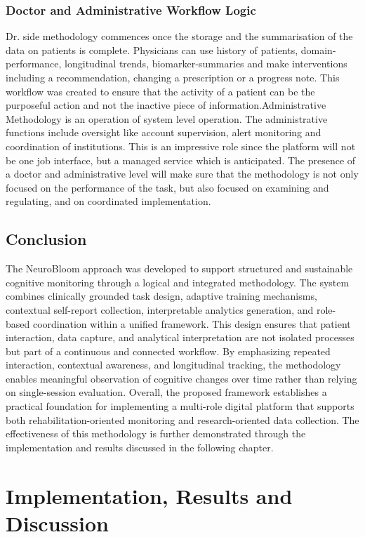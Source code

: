 \documentclass[12pt,a4paper]{report}
\begin{document}
\subsection{Doctor and Administrative Workflow Logic}
Dr. side methodology commences once the storage and the summarisation of the data on patients is complete. Physicians can use history of patients, domain-performance, longitudinal trends, biomarker-summaries and make interventions including a recommendation, changing a prescription or a progress note. This workflow was created to ensure that the activity of a patient can be the purposeful action and not the inactive piece of information.Administrative Methodology is an operation of system level operation. The administrative functions include oversight like account supervision, alert monitoring and coordination of institutions. This is an impressive role since the platform will not be one job interface, but a managed service which is anticipated. The presence of a doctor and administrative level will make sure that the methodology is not only focused on the performance of the task, but also focused on examining and regulating, and on coordinated implementation.

\section{Conclusion}
The NeuroBloom approach was developed to support structured and sustainable cognitive monitoring through a logical and integrated methodology. The system combines clinically grounded task design, adaptive training mechanisms, contextual self-report collection, interpretable analytics generation, and role-based coordination within a unified framework. This design ensures that patient interaction, data capture, and analytical interpretation are not isolated processes but part of a continuous and connected workflow. By emphasizing repeated interaction, contextual awareness, and longitudinal tracking, the methodology enables meaningful observation of cognitive changes over time rather than relying on single-session evaluation. Overall, the proposed framework establishes a practical foundation for implementing a multi-role digital platform that supports both rehabilitation-oriented monitoring and research-oriented data collection. The effectiveness of this methodology is further demonstrated through the implementation and results discussed in the following chapter.


\chapter{Implementation, Results and Discussion}
\end{document}
